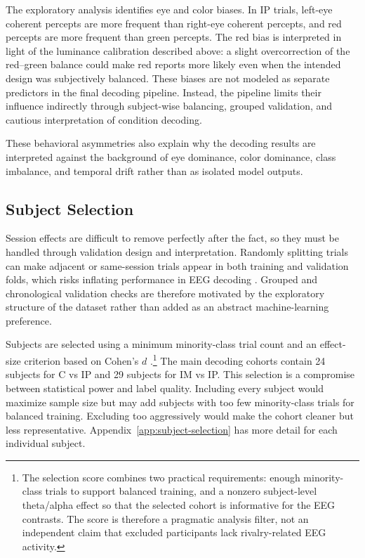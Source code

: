 \documentclass[11pt,a4paper,chapterprefix=false,parskip=false]{scrreprt}
\begin{document}
The exploratory analysis identifies eye and color biases. In IP trials, left-eye coherent percepts are more frequent than right-eye coherent percepts, and red percepts are more frequent than green percepts. The red bias is interpreted in light of the luminance calibration described above: a slight overcorrection of the red--green balance could make red reports more likely even when the intended design was subjectively balanced. These biases are not modeled as separate predictors in the final decoding pipeline. Instead, the pipeline limits their influence indirectly through subject-wise balancing, grouped validation, and cautious interpretation of condition decoding.

These behavioral asymmetries also explain why the decoding results are interpreted against the background of eye dominance, color dominance, class imbalance, and temporal drift rather than as isolated model outputs.

\subsection{Subject Selection}
Session effects are difficult to remove perfectly after the fact, so they must be handled through validation design and interpretation. Randomly splitting trials can make adjacent or same-session trials appear in both training and validation folds, which risks inflating performance in EEG decoding \citep{white_k-fold_2023, del_pup_role_2025}. Grouped and chronological validation checks are therefore motivated by the exploratory structure of the dataset rather than added as an abstract machine-learning preference.

Subjects are selected using a minimum minority-class trial count and an effect-size criterion based on Cohen's $d$ \citep{lakens_calculating_2013}.\footnote{The selection score combines two practical requirements: enough minority-class trials to support balanced training, and a nonzero subject-level theta/alpha effect so that the selected cohort is informative for the EEG contrasts. The score is therefore a pragmatic analysis filter, not an independent claim that excluded participants lack rivalry-related EEG activity.} The main decoding cohorts contain 24 subjects for C vs IP and 29 subjects for IM vs IP. This selection is a compromise between statistical power and label quality. Including every subject would maximize sample size but may add subjects with too few minority-class trials for balanced training. Excluding too aggressively would make the cohort cleaner but less representative. Appendix~\ref{app:subject-selection} has more detail for each individual subject.
\end{document}
